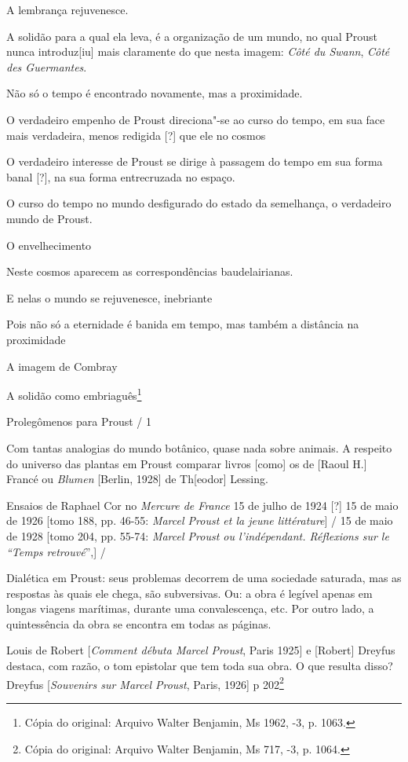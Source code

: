A lembrança rejuvenesce.

A solidão para a qual ela leva, é a organização de um mundo, no qual
Proust nunca introduz{[}iu{]} mais claramente do que nesta imagem:
\emph{Côté du Swann}, \emph{Côté des Guermantes}.

Não só o tempo é encontrado novamente, mas a proximidade.

O verdadeiro empenho de Proust direciona"-se ao curso do tempo, em sua
face mais verdadeira, menos redigida {[}?{]} que ele no cosmos

O verdadeiro interesse de Proust se dirige à passagem do tempo em sua
forma banal {[}?{]}, na sua forma entrecruzada no espaço.

O curso do tempo no mundo desfigurado do estado da semelhança, o
verdadeiro mundo de Proust.

O envelhecimento

Neste cosmos aparecem as correspondências baudelairianas.

E nelas o mundo se rejuvenesce, inebriante

Pois não só a eternidade é banida em tempo, mas também a distância na
proximidade

A imagem de Combray

A solidão como embriaguês\footnote{Cópia do original: Arquivo Walter Benjamin, Ms 1962,
-3, p. 1063.}

Prolegômenos para Proust / 1

Com tantas analogias do mundo botânico, quase nada sobre animais. A
respeito do universo das plantas em Proust comparar livros {[}como{]} os
de {[}Raoul H.{]} Francé ou \emph{Blumen} {[}Berlin, 1928{]} de Th{[}eodor{]} Lessing.

Ensaios de Raphael Cor no \emph{Mercure de France} 15 de julho de 1924
{[}?{]} 15 de maio de 1926 {[}tomo 188, pp. 46-55: \emph{Marcel Proust et
la jeune littérature}{]} / 15 de maio de 1928 {[}tomo 204, pp. 55-74:
\emph{Marcel Proust ou l'indépendant. Réflexions sur le ``Temps
retrouvé}'',{]} /

Dialética em Proust: seus problemas decorrem de uma sociedade saturada,
mas as respostas às quais ele chega, são subversivas. Ou: a obra é
legível apenas em longas viagens marítimas, durante uma convalescença,
etc. Por outro lado, a quintessência da obra se encontra em todas as
páginas.

Louis de Robert {[}\emph{Comment débuta Marcel Proust}, Paris 1925{]} e
{[}Robert{]} Dreyfus destaca, com razão, o tom epistolar que tem toda
sua obra. O que resulta disso? Dreyfus {[}\emph{Souvenirs sur Marcel
Proust}, Paris, 1926{]} p 202\footnote{Cópia do original: Arquivo Walter Benjamin, Ms 717,
-3, p. 1064.}

